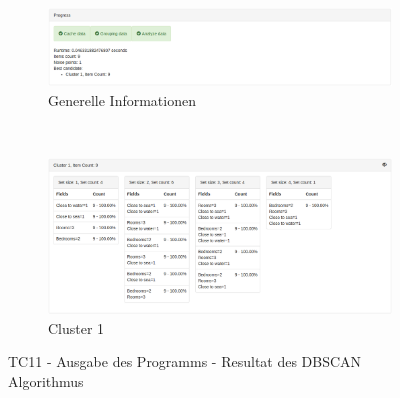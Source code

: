\begin{figure}[H]
	\begin{subfigure}[t]{1\textwidth}
		\centering
		\includegraphics[width=1\textwidth]{images/tc11-dbscan-1}
		\caption{Generelle Informationen}
		\label{fig:testingfazit:testing:testcases:11-1-1}
	\end{subfigure} \\
	\begin{subfigure}[t]{1\textwidth}
		\centering
		\includegraphics[width=1\textwidth]{images/tc11-dbscan-2}
		\caption{Cluster 1}
		\label{fig:testingfazit:testing:testcases:11-1-2}
	\end{subfigure}
	\caption{TC11 - Ausgabe des Programms - Resultat des DBSCAN Algorithmus}
	\label{fig:testingfazit:testing:testcases:11-1}
\end{figure}

